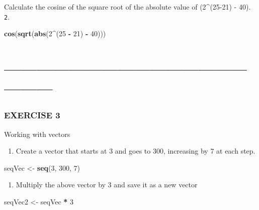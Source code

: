 \documentclass[]{article}
\newenvironment{Shaded}{\begin{snugshade}}{\end{snugshade}}
\newcommand{\KeywordTok}[1]{\textcolor[rgb]{0.13,0.29,0.53}{\textbf{#1}}}
\newcommand{\DecValTok}[1]{\textcolor[rgb]{0.00,0.00,0.81}{#1}}
\newcommand{\StringTok}[1]{\textcolor[rgb]{0.31,0.60,0.02}{#1}}
\newcommand{\OperatorTok}[1]{\textcolor[rgb]{0.81,0.36,0.00}{\textbf{#1}}}
\newcommand{\NormalTok}[1]{#1}
\providecommand{\tightlist}{%
  \setlength{\itemsep}{0pt}\setlength{\parskip}{0pt}}
\begin{document}
Calculate the cosine of the square root of the absolute value of
(2\^{}(25-21) - 40). \texttt{2}.

\begin{Shaded}
\begin{Highlighting}[]
\KeywordTok{cos}\NormalTok{(}\KeywordTok{sqrt}\NormalTok{(}\KeywordTok{abs}\NormalTok{(}\DecValTok{2}\OperatorTok{^}\NormalTok{(}\DecValTok{25} \OperatorTok{-}\StringTok{ }\DecValTok{21}\NormalTok{) }\OperatorTok{-}\StringTok{ }\DecValTok{40}\NormalTok{)))}
\end{Highlighting}
\end{Shaded}

\section{------------------------------------------------------}\label{section-1}

\subsubsection{EXERCISE 3}\label{exercise-3}

Working with vectors

\begin{enumerate}
\def\labelenumi{\arabic{enumi}.}
\tightlist
\item
  Create a vector that starts at 3 and goes to 300, increasing by 7 at
  each step.
\end{enumerate}

\begin{Shaded}
\begin{Highlighting}[]
\NormalTok{seqVec <-}\StringTok{ }\KeywordTok{seq}\NormalTok{(}\DecValTok{3}\NormalTok{, }\DecValTok{300}\NormalTok{, }\DecValTok{7}\NormalTok{)}
\end{Highlighting}
\end{Shaded}

\begin{enumerate}
\def\labelenumi{\arabic{enumi}.}
\setcounter{enumi}{1}
\tightlist
\item
  Multiply the above vector by 3 and save it as a new vector
\end{enumerate}

\begin{Shaded}
\begin{Highlighting}[]
\NormalTok{seqVec2 <-}\StringTok{ }\NormalTok{seqVec }\OperatorTok{*}\StringTok{ }\DecValTok{3}
\end{Highlighting}
\end{Shaded}
\end{document}
